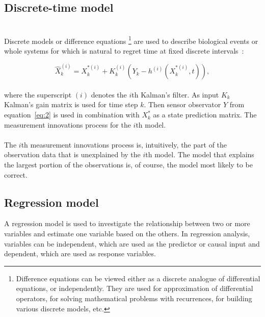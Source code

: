 \subsection{Discrete-time model} \label{subsec:discrete}\\
Discrete models or difference equations \footnote{Difference equations can be viewed either as a discrete analogue of differential equations, or independently.
They are used for approximation of differential operators, for solving mathematical problems with recurrences, for building various discrete
models, etc.} are used to describe biological events or whole systems for which is natural to regret time at fixed discrete intervals~\cite{pantland}:

\begin{equation} \label{eq:3}
\hat{X}_{k}^{(i)} = X_{k}^{*(i)} + K_k^{(i)}(Y_k - h^{(i)}(X_{k}^{*(i)},t)),
\end{equation}
\\
where the superscript $(i)$ denotes the $i$th Kalman's filter.
As input $K_k$ Kalman's gain matrix is used for time step $k$.
Then sensor observator $Y$ from equation~\ref{eq:2} is used in combination with $X_{k}^{*}$ as a state prediction matrix.
The measurement innovations process for the $i$th model.\\
\\
The $i$th measurement innovations process is, intuitively, the part of the observation data that is unexplained by the $i$th model.
The model that explains the largest portion of the observations is, of course, the model most likely to be correct.\\
\subsection{Regression model} \label{sec:regression}
A regression model is used to investigate the relationship between two or more variables and estimate one variable based on the others.
In regression analysis, variables can be independent, which are used as the predictor or causal input and dependent, which are used as response variables.


